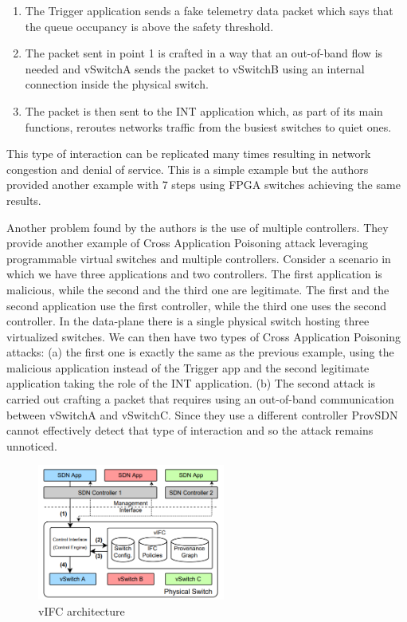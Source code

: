 \begin{enumerate}
    \item The Trigger application sends a fake telemetry data packet which says that the queue occupancy is above the safety threshold.
    \item The packet sent in point 1 is crafted in a way that an out-of-band flow is needed and vSwitchA sends the packet to vSwitchB using an internal connection inside the physical switch. 
    \item The packet is then sent to the INT application which, as part of its main functions, reroutes networks traffic from the busiest switches to quiet ones. 
\end{enumerate}

This type of interaction can be replicated many times resulting in network congestion and denial of service. This is a simple example but the authors provided another example with 7 steps using FPGA switches achieving the same results.
\medskip

Another problem found by the authors is the use of multiple controllers. They provide another example of Cross Application Poisoning attack leveraging programmable virtual switches and multiple controllers. Consider a scenario in which we have three applications and two controllers. The first application is malicious, while the second and the third one are legitimate. The first and the second application use the first controller, while the third one uses the second controller. In the data-plane there is a single physical switch hosting three virtualized switches. We can then have two types of Cross Application Poisoning attacks: (a) the first one is exactly the same as the previous example, using the malicious application instead of the Trigger app and the second legitimate application taking the role of the INT application. (b) The second attack is carried out crafting a packet that requires using an out-of-band communication between vSwitchA and vSwitchC. Since they use a different controller ProvSDN cannot effectively detect that type of interaction and so the attack remains unnoticed.
\medskip

\begin{figure}
\caption{vIFC architecture}
\label{fig:vcap}
\includegraphics[width=0.55\textwidth]{resources/Chapter-1/vifc-arch.png}
\end{figure}

